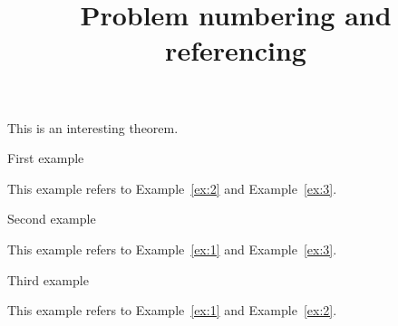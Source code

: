 \documentclass{ximera}
\title{Problem numbering and referencing}
\begin{document}
\begin{abstract}
\end{abstract}
\maketitle
\label{xim:problemNumbersBase}


 \begin{theorem} \label{thm:1}
  
  This is an interesting  theorem.  
  
 \end{theorem}

\begin{example} \label{ex:1}
 First example  

 This example refers to Example~\ref{ex:2} and Example~\ref{ex:3}.

\end{example}

\begin{example} \label{ex:2}
 Second example  

  This example refers to Example~\ref{ex:1} and Example~\ref{ex:3}.
\end{example}

\begin{example} \label{ex:3}
 Third example  

  This example refers to Example~\ref{ex:1} and Example~\ref{ex:2}.
\end{example}

\lipsum
\lipsum
\lipsum
\lipsum
\end{document}
